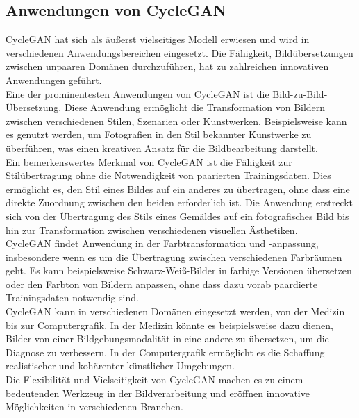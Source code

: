 \subsection{Anwendungen von CycleGAN}
CycleGAN hat sich als äußerst vielseitiges Modell erwiesen und wird in verschiedenen Anwendungsbereichen eingesetzt. Die Fähigkeit, Bildübersetzungen zwischen unpaaren Domänen durchzuführen, hat zu zahlreichen innovativen Anwendungen geführt.
\\
Eine der prominentesten Anwendungen von CycleGAN ist die Bild-zu-Bild-\\Übersetzung. Diese Anwendung ermöglicht die Transformation von Bildern zwischen verschiedenen Stilen, Szenarien oder Kunstwerken. Beispielsweise kann es genutzt werden, um Fotografien in den Stil bekannter Kunstwerke zu überführen, was einen kreativen Ansatz für die Bildbearbeitung darstellt.
\\
Ein bemerkenswertes Merkmal von CycleGAN ist die Fähigkeit zur Stilübertragung ohne die Notwendigkeit von paarierten Trainingsdaten. Dies ermöglicht es, den Stil eines Bildes auf ein anderes zu übertragen, ohne dass eine direkte Zuordnung zwischen den beiden erforderlich ist. Die Anwendung erstreckt sich von der Übertragung des Stils eines Gemäldes auf ein fotografisches Bild bis hin zur Transformation zwischen verschiedenen visuellen Ästhetiken.
\\
CycleGAN findet Anwendung in der Farbtransformation und -anpassung, insbesondere wenn es um die Übertragung zwischen verschiedenen Farbräumen geht. Es kann beispielsweise Schwarz-Weiß-Bilder in farbige Versionen übersetzen oder den Farbton von Bildern anpassen, ohne dass dazu vorab paardierte Trainingsdaten notwendig sind.
\\
CycleGAN kann in verschiedenen Domänen eingesetzt werden, von der Medizin bis zur Computergrafik. In der Medizin könnte es beispielsweise dazu dienen, Bilder von einer Bildgebungsmodalität in eine andere zu übersetzen, um die Diagnose zu verbessern. In der Computergrafik ermöglicht es die Schaffung realistischer und kohärenter künstlicher Umgebungen.
\\
Die Flexibilität und Vielseitigkeit von CycleGAN machen es zu einem bedeutenden Werkzeug in der Bildverarbeitung und eröffnen innovative Möglichkeiten in verschiedenen Branchen.
